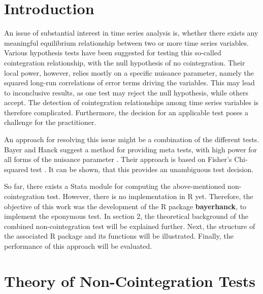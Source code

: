 \documentclass[11pt,a4paper]{article}
\begin{document}
\restoregeometry


{
\hypersetup{linkcolor=black}
\setcounter{tocdepth}{3}
\tableofcontents
}
\newpage
\listoftables
\newpage
\listoffigures
\newpage
{} 
\hypertarget{introduction}{%
\section{Introduction}\label{introduction}}

An issue of substantial interest in time series analysis is, whether
there exists any meaningful equilibrium relationship between two or more
time series variables. Various hypothesis tests have been suggested for
testing this so-called cointegration relationship, with the null
hypothesis of no cointegration. Their local power, however, relies
mostly on a specific nuisance parameter, namely the squared long-run
correlations of error terms driving the variables. This may lead to
inconclusive results, as one test may reject the null hypothesis, while
others accept. The detection of cointegration relationships among time
series variables is therefore complicated. Furthermore, the decision for
an applicable test poses a challenge for the practitioner.

An approach for resolving this issue might be a combination of the
different tests. Bayer and Hanck suggest a method for providing meta
tests, with high power for all forms of the nuisance parameter
\autocite{Bayerhanck2009}. Their approach is based on Fisher's
Chi-squared test \autocite{Fisher1925}. It can be shown, that this
provides an unambiguous test decision.

So far, there exists a Stata module for computing the above-mentioned
non-cointegration test. However, there is no implementation in R yet.
Therefore, the objective of this work was the development of the R
package \textbf{bayerhanck}, to implement the eponymous test. In section
2, the theoretical background of the combined non-cointegration test
will be explained further. Next, the structure of the associated R
package and its functions will be illustrated. Finally, the performance
of this approach will be evaluated.

\hypertarget{theory-of-non-cointegration-tests}{%
\section{Theory of Non-Cointegration
Tests}\label{theory-of-non-cointegration-tests}}
\end{document}
